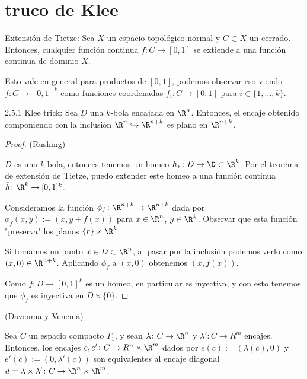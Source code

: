 \section{truco de Klee}

\begin{teo}
    Extensión de Tietze: Sea $X$ un espacio topológico normal y $C\subset X$ un cerrado. 
    Entonces, cualquier función continua $f:C\to [0,1]$ se extiende a una función continua de dominio $X$.
\end{teo}

\begin{obs}
    Esto vale en general para productos de $[0,1]$, podemos observar eso viendo $f\colon C\to[0,1]^k$ como funciones coordenadas $f_i\colon C\to [0,1]$ para $i\in\{1,\dots,k\}$.
\end{obs}


\begin{teo}
    2.5.1 Klee trick: Sea $D$ una $k$-bola encajada en $\R^{n}$. Entonces, el encaje obtenido componiendo con la inclusión $\R^n\hookrightarrow \R^{n+k}$ es plano en $\R^{n+k}$.
\end{teo}

\begin{proof} (Rushing)

    $D$ es una $k$-bola, entonces tenemos un homeo $h_*\colon D\to \D \subset\R^k$. Por el teorema de extensión de Tietze, puedo extender este homeo a una función continua $\tilde{h}\colon\R^{k}\to [0,1]^k$.

    Consideramos la función $\phi_f\colon \R^{n+k}\to \R^{n+k}$ dada por $\phi_f(x,y):=\left(x,y+f(x)\right)$ para $x\in\R^n$, $y\in\R^k$. Observar que esta función "preserva" los planos $\{r\}\times\R^k$

    Si tomamos un punto $x\in D\subset \R^n$, al pasar por la inclusión podemos verlo como $(x,0)\in\R^{n+k}$. Aplicando $\phi_f$ a $(x,0)$ obtenemos $(x, f(x))$.

    Como $f\colon D\to[0,1]^k$ es un homeo, en particular es inyectiva, y con esto tenemos que $\phi_f$ es inyectiva en $D\times\{0\}$.

\end{proof} 

\begin{teo}(Davenma y Venema)

    Sea $C$ un espacio compacto $T_1$, y sean $\lambda\colon C\to\R^n$ y $\lambda'\colon C\to R^m$ encajes. Entonces, los encajes $e, e'\colon C\to R^n\times\R^m$ dados por $e(c):=\left(\lambda(c),0\right)$ y $e'(c):=\left(0, \lambda'(c)\right)$ son equivalentes al encaje diagonal $d=\lambda\times\lambda'\colon C\to \R^n\times\R^m$.

\end{teo}

